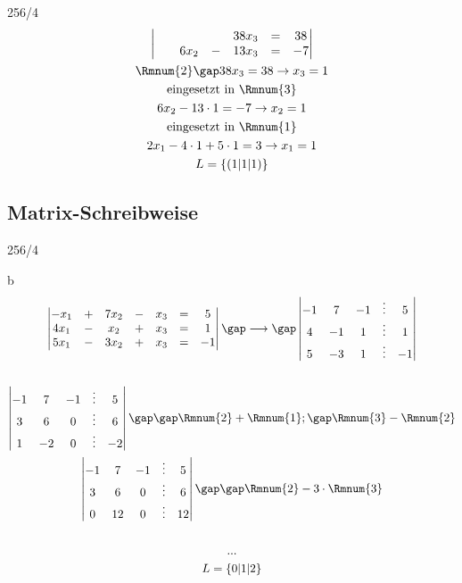 \begin{exercise}{256/4}
\begin{gather*}
\begin{vmatrix}
      &&&& 38x_3 & = & 38 \\
      && 6x_2 & - & 13x_3 & = & -7
    \end{vmatrix} \\
    \text{\Rmnum{2}} \gap 38x_3 = 38 \rightarrow x_3 = 1 \\
    \text{eingesetzt in \Rmnum{3}} \\
    6x_2 - 13 \cdot 1 = -7 \rightarrow x_2 = 1 \\
    \text{eingesetzt in \Rmnum{1}} \\
    2x_1 - 4 \cdot 1 + 5 \cdot 1 = 3 \rightarrow x_1 = 1 \\
    L = \{(1|1|1)\}
  \end{gather*}
\end{exercise}
\subsection{Matrix-Schreibweise}
\begin{exercise}{256/4}
  \item [b]
  \begin{gather*}
    \begin{vmatrix}
      -x_1 & + & 7x_2 & - & x_3 & = & 5 \\
      4x_1 & - & x_2 & + & x_3 & = & 1 \\
      5x_1 & - & 3x_2 & + & x_3 & = & -1
    \end{vmatrix} \gap\longrightarrow\gap
    \begin{vmatrix}
      -1 & 7 & -1 & \vdots & 5 \\
      4 & -1 & 1 & \vdots & 1 \\
      5 & -3 & 1 & \vdots & -1
    \end{vmatrix} \\\\
    \begin{vmatrix}
      -1 & 7 & -1 & \vdots & 5 \\
      3 & 6 & 0 & \vdots & 6 \\
      1 & -2 & 0 & \vdots & -2
    \end{vmatrix} \gap\gap \Rmnum{2} + \Rmnum{1}; \gap \Rmnum{3} - \Rmnum{2} \\
    \begin{vmatrix}
      -1 & 7 & -1 & \vdots & 5 \\
      3 & 6 & 0 & \vdots & 6 \\
      0 & 12 & 0 & \vdots & 12
    \end{vmatrix} \gap\gap \Rmnum{2} - 3 \cdot \Rmnum{3} \\\\
    ... \\
    L = \{0|1|2\}
  \end{gather*}
\end{exercise}
